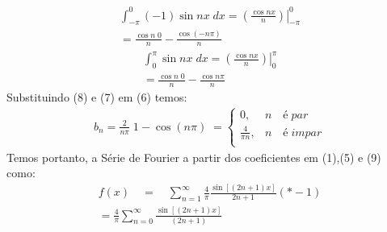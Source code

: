 \documentclass[12pt]{article}
\newcommand*\Eval[3]{\left.#1\right\rvert_{#2}^{#3}}
\begin{document}
\begin{enumerate}[label=S.]
    \begin{equation}
    \begin{split}
    \int_{-\pi}^{0} (-1) \sin nx \; dx = \Eval{\left(\frac{\cos nx}{n}\right)}{-\pi}{0} \\
    = \frac{\cos n\;0}{n} - \frac{\cos (- n\pi)}{n}
    \end{split}
    \end{equation}
    \begin{equation}
    \begin{split}
    \int_{0}^{\pi}\sin nx \; dx = \Eval{\left(\frac{\cos nx}{n}\right)}{0}{\pi} \\
    = \frac{\cos n\;0}{n} - \frac{\cos  n\pi}{n}
    \end{split}
    \end{equation}
    Substituindo (8) e (7) em (6) temos:
    \begin{equation}
    \begin{split}
    b_{n}= \frac{2}{n\pi} \; 1-\cos(n\pi)\; =
    \begin{cases}
    0 , & n \quad é\;  par\\
    \frac{4}{\pi n} , & n \quad é\;  impar\\
    \end{cases}
    \end{split}
    \end{equation}
    Temos portanto, a Série de Fourier a partir dos coeficientes em (1),(5) e (9) como:
    \begin{equation}
    \begin{split}
    f(x) \quad=\quad \sum_{n=1}^{\infty} \frac{4}{\pi}  \frac{\sin[(2n+1)x]}{2n+1}(*-1) \\= \frac{4}{\pi} \sum_{n=0}^{\infty} \frac{\sin[(2n+1)x]}{(2n+1)}
    \end{split}
    \end{equation}
   \end{enumerate}
\end{document}
